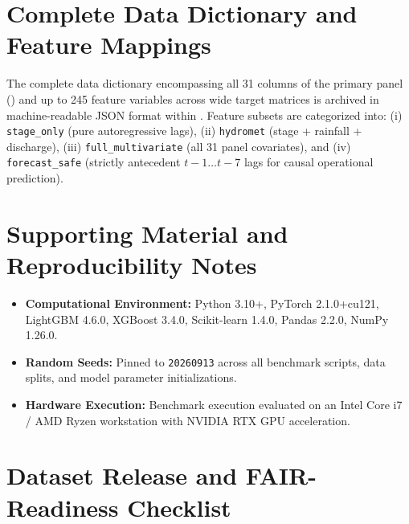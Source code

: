 \documentclass[11pt,a4paper]{article}
\begin{document}
\clearpage

\appendix

\section{Complete Data Dictionary and Feature Mappings}
\label{app:data_dictionary}
The complete data dictionary encompassing all 31 columns of the primary panel () and up to 245 feature variables across wide target matrices is archived in machine-readable JSON format within . Feature subsets are categorized into: (i) \texttt{stage\_only} (pure autoregressive lags), (ii) \texttt{hydromet} (stage + rainfall + discharge), (iii) \texttt{full\_multivariate} (all 31 panel covariates), and (iv) \texttt{forecast\_safe} (strictly antecedent $t-1\dots t-7$ lags for causal operational prediction).

\section{Supporting Material and Reproducibility Notes}
\label{app:supporting}
\begin{itemize}[leftmargin=18pt,itemsep=2pt]
  \item \textbf{Computational Environment:} Python 3.10+, PyTorch 2.1.0+cu121, LightGBM 4.6.0, XGBoost 3.4.0, Scikit-learn 1.4.0, Pandas 2.2.0, NumPy 1.26.0.
  \item \textbf{Random Seeds:} Pinned to \texttt{20260913} across all benchmark scripts, data splits, and model parameter initializations.
  \item \textbf{Hardware Execution:} Benchmark execution evaluated on an Intel Core i7 / AMD Ryzen workstation with NVIDIA RTX GPU acceleration.
\end{itemize}

\clearpage

\section{Dataset Release and FAIR-Readiness Checklist}
\label{app:fair}
\end{document}
